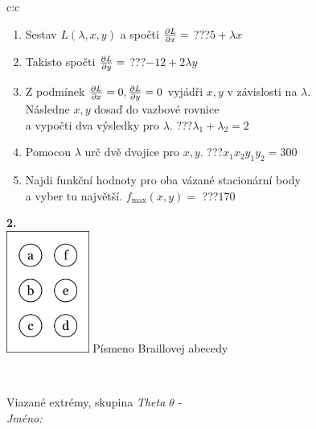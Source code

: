 \documentclass[10pt]{report}
\begin{document}
\begin{tabular}{c:c}
\begin{minipage}[c][104.5mm][t]{0.5\linewidth}
\begin{center}
\begin{minipage}{0.79\linewidth}
\begin{center}
\begin{varwidth}{\linewidth}
\begin{enumerate}
\item Sestav $L(\lambda,x,y)$ a spočti $\pdv{L}{x}=$\quad \dotfill\; ???\;\dotfill \quad $5+\lambda x$
\item Takisto spočti $\pdv{L}{y}=$\quad \dotfill\; ???\;\dotfill \quad $-12+2\lambda y$
\item Z podmínek $\pdv{L}{x}=0 , \pdv{L}{y}=0$ vyjádři $x,y$ v závislosti na $\lambda$.\\ \phantom{xxxxxx}Následne $x,y$ dosaď do vazbové rovnice\\ \phantom{xxxxxx}a vypočti dva výsledky pro $\lambda$.\quad \dotfill\; ???\;\dotfill \quad $\lambda_1+\lambda_2=2$
\item Pomocou $\lambda$ urč dvě dvojice pro $x,y$.\quad \dotfill\; ???\;\dotfill \quad $x_1 x_2 y_1 y_2=300$
\item Najdi funkční hodnoty pro oba vázané stacionární body\\ \phantom{xxxxxx}a vyber tu najvětší. $f_{\text{max}}(x,y)=$\quad \dotfill\; ???\;\dotfill \quad $170$
\end{enumerate}
\end{varwidth}
\end{center}
\end{minipage}
\begin{minipage}{0.20\linewidth}
\begin{center}
{\Huge\bfseries 2.} \\[2mm]
\includegraphics[height=40mm]{../images/braille.png}
{\small Písmeno Braillovej abecedy}
\end{center}
\end{minipage}
\end{center}
\end{minipage}
\\ \hdashline
\begin{minipage}[c][104.5mm][t]{0.5\linewidth}
\begin{center}
\vspace{7mm}
{\huge Viazané extrémy, skupina \textit{Theta $\theta$} -}\\[5mm]
\textit{Jméno:}\phantom{xxxxxxxxxxxxxxxxxxxxxxxxxxxxxxxxxxxxxxxxxxxxxxxxxxxxxxxxxxxxxxxxx}\\[5mm]

\end{center}
\end{minipage}
\end{tabular}
\end{document}
